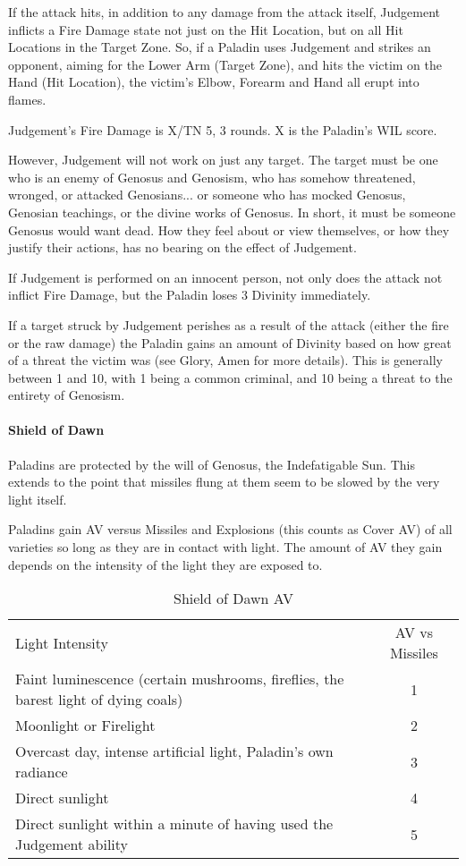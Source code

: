 \documentclass[oneside,11pt,english]{book}
\begin{document}
If the attack hits, in addition to any damage from the attack itself, Judgement inflicts a Fire Damage state not just on the Hit Location, but on all Hit Locations in the Target Zone. So, if a Paladin uses Judgement and strikes an opponent, aiming for the Lower Arm (Target Zone), and hits the victim on the Hand (Hit Location), the victim's Elbow, Forearm and Hand all erupt into flames.

Judgement's Fire Damage is X/TN 5, 3 rounds. X is the Paladin's WIL score.

However, Judgement will not work on just any target. The target must be one who is an enemy of 
Genosus and Genosism, who has somehow threatened, wronged, or attacked Genosians... or 
someone who has mocked Genosus, Genosian teachings, or the divine works of Genosus. In 
short, it must be someone Genosus would want dead. How they feel about or view themselves, or 
how they justify their actions, has no bearing on the effect of Judgement. 

If Judgement is performed on an innocent person, not only does the attack not inflict Fire Damage, but the Paladin loses 3 Divinity immediately. 

If a target struck by Judgement perishes as a result of the attack (either the fire or the raw 
damage) the Paladin gains an amount of Divinity based on how great of a threat the victim was 
(see Glory, Amen for more details). This is generally between 1 and 10, with 1 being a common 
criminal, and 10 being a threat to the entirety of Genosism. 
\paragraph{Shield of Dawn}
Paladins are protected by the will of Genosus, the Indefatigable Sun. This extends to the point 
that missiles flung at them seem to be slowed by the very light itself.

Paladins gain AV versus Missiles and Explosions (this counts as Cover AV) of all varieties so 
long as they are in contact with light. The amount of AV they gain depends on the intensity of the 
light they are exposed to.

\begin{table}[!ht]
	\caption{Shield of Dawn AV}
	\label{tab:Shield of Dawn AV}
	\begin{tabu} spread 0pt {Xc}
		Light Intensity& AV vs Missiles\\
		Faint luminescence (certain mushrooms, fireflies, the barest light of dying coals)& 1\\
		Moonlight or Firelight &2\\
		Overcast day, intense artificial light, Paladin's own radiance& 3\\
		Direct sunlight& 4\\
		Direct sunlight within a minute of having used the Judgement ability& 5\\
	\end{tabu}
\end{table}
\end{document}
